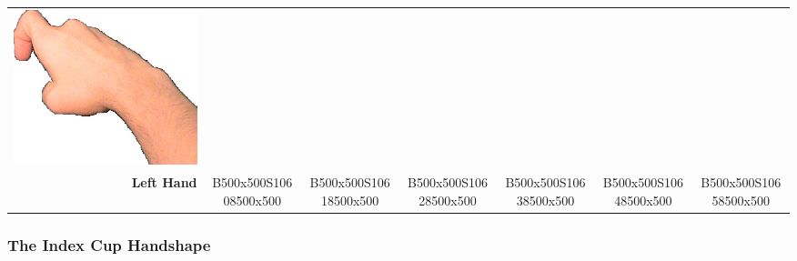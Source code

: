 \documentclass{article}
\begin{document}
\begin{center}
\begin{tabular}{r*{6}{c}}
\includegraphics[scale=0.1]{images/01-04-6.jpg}\\
\textbf{Left Hand}&
B500x500S10608500x500&
B500x500S10618500x500&
B500x500S10628500x500&
B500x500S10638500x500&
B500x500S10648500x500&
B500x500S10658500x500\\
\end{tabular}
\end{center}

\subsubsection{The Index Cup Handshape}
\end{document}
